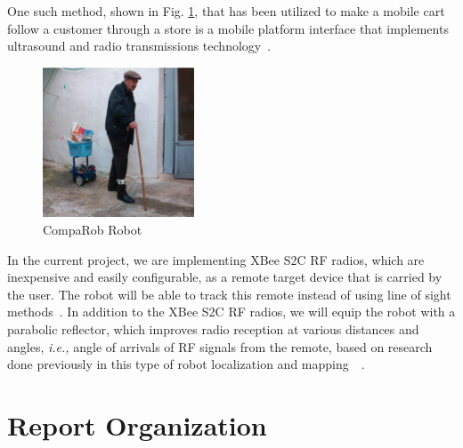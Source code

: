 \vspace*{12pt}
\noindent
One such method, shown in Fig. \ref{fig:CompaRob}, that has been utilized to make a mobile cart follow a customer through a store is a mobile platform interface that implements ultrasound and radio transmissions technology~\cite{Sales2016-CompaRob}.
\begin{figure}[H]
   \centering
   \includegraphics[width=0.4\textwidth]{figs/img/CompaRob}
   \caption{CompaRob Robot}
   \label{fig:CompaRob}
\end{figure}

In the current project, we are implementing XBee S2C RF radios, which are inexpensive and easily configurable, as a remote target device that is carried by the user. The robot will be able to track this remote instead of using line of sight methods~\cite{Miah2018-Intelligent}. In addition to the XBee S2C RF radios, we will equip the robot with a parabolic reflector, which improves radio reception at various distances and angles, \textit{i.e.,} angle of arrivals of RF signals from the remote, based on research done previously in this type of robot localization and mapping~\cite{Miah2018-Intelligent}~\cite{Li2013ANA}.


\section{Report Organization}

